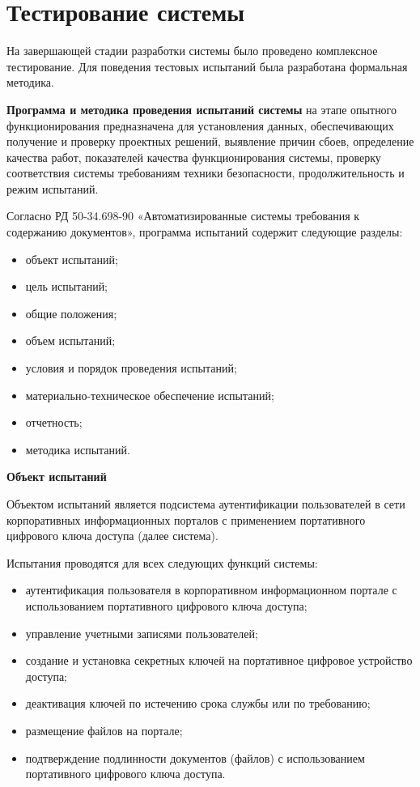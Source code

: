 \section{Тестирование системы}

На завершающей стадии разработки системы было проведено комплексное
тестирование. Для поведения тестовых испытаний была разработана формальная
методика.

\textbf{Программа и методика проведения испытаний системы} на этапе опытного
функционирования предназначена для установления данных, обеспечивающих получение
и проверку проектных решений, выявление причин сбоев, определение качества
работ, показателей качества функционирования системы, проверку соответствия
системы требованиям техники безопасности, продолжительность и режим испытаний.

Согласно РД 50-34.698-90 «Автоматизированные системы требования к содержанию
документов», программа испытаний содержит следующие разделы:
\begin{itemize}
  \item объект испытаний;
  \item цель испытаний;
  \item общие положения;
  \item объем испытаний;
  \item условия и порядок проведения испытаний;
  \item материально-техническое обеспечение
испытаний;
  \item отчетность;
  \item методика испытаний.
\end{itemize}

\textbf{Объект испытаний}

Объектом испытаний является подсистема аутентификации
пользователей в сети корпоративных информационных порталов с применением
портативного цифрового ключа доступа (далее система).

Испытания проводятся для всех следующих функций системы:
\begin{itemize}
  \item аутентификация пользователя в корпоративном информационном портале с
использованием портативного цифрового ключа доступа;
  \item управление учетными
записями пользователей;
  \item создание и установка секретных ключей на портативное
цифровое устройство доступа;
  \item деактивация ключей по истечению срока службы или
по требованию;
  \item размещение файлов на портале;
  \item подтверждение подлинности
документов (файлов) с использованием портативного цифрового ключа доступа.
\end{itemize}

